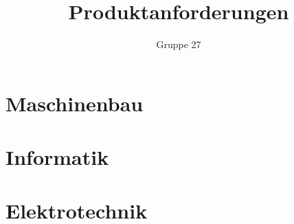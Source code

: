 \documentclass[a4paper,10pt,fleqn]{article}
\title{Produktanforderungen}
\author{Gruppe 27}
\begin{document}
\maketitle
\clearpage
\tableofcontents
\clearpage

\section{Maschinenbau}

\section{Informatik}

\section{Elektrotechnik}
\end{document}
